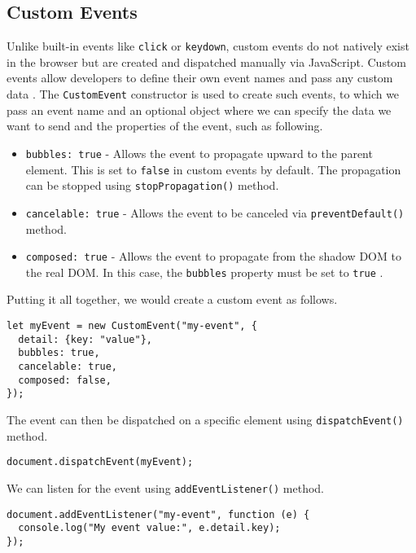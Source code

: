 \subsection{Custom Events}
Unlike built-in events like \texttt{click} or \texttt{keydown}, custom events do not natively exist in the browser but are created and dispatched manually via JavaScript. Custom events allow developers to define their own event names and pass any custom data \cite{MDNCustomEvent}. The \texttt{CustomEvent} constructor is used to create such events, to which we pass an event name and an optional object where we can specify the data we want to send and the properties of the event, such as following.
\begin{itemize}
    \item \texttt{bubbles: true} - Allows the event to propagate upward to the parent element. This is set to \texttt{false} in custom events by default. The propagation can be stopped using \texttt{stopPropagation()} method.
    \item \texttt{cancelable: true} - Allows the event to be canceled via \texttt{preventDefault()} method.
    \item \texttt{composed: true} - Allows the event to propagate from the shadow DOM to the real DOM. In this case, the \texttt{bubbles} property must be set to \texttt{true} \cite{JamesCustomEvent}.
\end{itemize}
Putting it all together, we would create a custom event as follows.
\begin{verbatim}
let myEvent = new CustomEvent("my-event", {
  detail: {key: "value"},
  bubbles: true,
  cancelable: true,
  composed: false,
});
\end{verbatim}
The event can then be dispatched on a specific element using \texttt{dispatchEvent()} method.
\begin{verbatim}
document.dispatchEvent(myEvent);
\end{verbatim}
We can listen for the event using \texttt{addEventListener()} method.
\begin{verbatim}
document.addEventListener("my-event", function (e) {
  console.log("My event value:", e.detail.key);
});
\end{verbatim}
